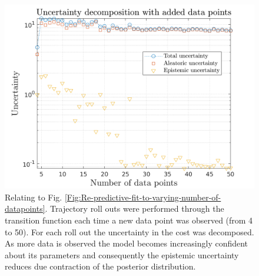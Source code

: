 \begin{figure}[htp!]
\centering    
\includegraphics[width=1\textwidth]{Chapter3/Figures/func_uncertainty_4.png}
\caption[Uncertainty decomposition showing reduction in epistemic uncertainty with increasing number of data points]{Relating to Fig. \ref{Fig:Re-predictive-fit-to-varying-number-of-datapoints}. Trajectory roll outs were performed through the transition function each time a new data point was observed (from 4 to 50). For each roll out the uncertainty in the cost was decomposed. As more data is observed the model becomes increasingly confident about its parameters and consequently the epistemic uncertainty reduces due contraction of the posterior distribution.}
\label{Fig:Re-reduction-in-epsitemic-with-more-data}
\end{figure}



